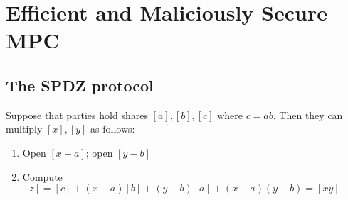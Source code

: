 \section{Efficient and Maliciously Secure MPC}

\subsection{The SPDZ protocol}

Suppose that parties hold shares $[a], [b], [c]$ where $c = a b$.
Then they can multiply $[x], [y]$ as follows:
\begin{enumerate}
\item
Open $[x-a]$;
open $[y-b]$
\item 
Compute $[z] = [c] + (x - a)[b] + (y - b)[a] + (x - a)(y - b) = [x y]$
\end{enumerate}

